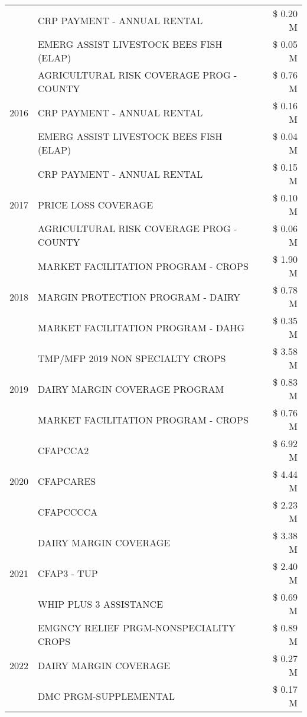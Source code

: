 \begin{tabular}{llr}
 & CRP PAYMENT - ANNUAL RENTAL & \$ 0.20 M \\
 & EMERG ASSIST LIVESTOCK BEES FISH (ELAP) & \$ 0.05 M \\
\cline{1-3}
\multirow[t]{3}{*}{2016} & AGRICULTURAL RISK COVERAGE PROG - COUNTY & \$ 0.76 M \\
 & CRP PAYMENT - ANNUAL RENTAL & \$ 0.16 M \\
 & EMERG ASSIST LIVESTOCK BEES FISH (ELAP) & \$ 0.04 M \\
\cline{1-3}
\multirow[t]{3}{*}{2017} & CRP PAYMENT - ANNUAL RENTAL & \$ 0.15 M \\
 & PRICE LOSS COVERAGE & \$ 0.10 M \\
 & AGRICULTURAL RISK COVERAGE PROG - COUNTY & \$ 0.06 M \\
\cline{1-3}
\multirow[t]{3}{*}{2018} & MARKET FACILITATION PROGRAM - CROPS & \$ 1.90 M \\
 & MARGIN PROTECTION PROGRAM - DAIRY & \$ 0.78 M \\
 & MARKET FACILITATION PROGRAM - DAHG & \$ 0.35 M \\
\cline{1-3}
\multirow[t]{3}{*}{2019} & TMP/MFP 2019 NON SPECIALTY CROPS & \$ 3.58 M \\
 & DAIRY MARGIN COVERAGE PROGRAM & \$ 0.83 M \\
 & MARKET FACILITATION PROGRAM - CROPS & \$ 0.76 M \\
\cline{1-3}
\multirow[t]{3}{*}{2020} & CFAPCCA2 & \$ 6.92 M \\
 & CFAPCARES & \$ 4.44 M \\
 & CFAPCCCCA & \$ 2.23 M \\
\cline{1-3}
\multirow[t]{3}{*}{2021} & DAIRY MARGIN COVERAGE & \$ 3.38 M \\
 & CFAP3 - TUP & \$ 2.40 M \\
 & WHIP PLUS 3 ASSISTANCE & \$ 0.69 M \\
\cline{1-3}
\multirow[t]{3}{*}{2022} & EMGNCY RELIEF PRGM-NONSPECIALITY CROPS & \$ 0.89 M \\
 & DAIRY MARGIN COVERAGE & \$ 0.27 M \\
 & DMC PRGM-SUPPLEMENTAL & \$ 0.17 M \\
\cline{1-3}
\bottomrule
\end{tabular}
